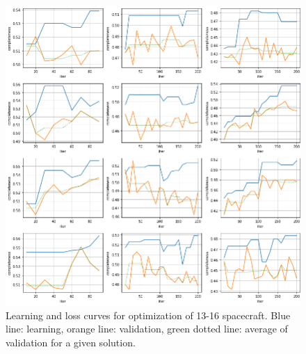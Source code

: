 \begin{figure}[p]
 \centering
 \includegraphics[width=1.0\textwidth]{img/appendix_loss_4.png}
 \caption{Learning and loss curves for optimization of 13-16 spacecraft. Blue line: learning, orange line: validation, green dotted line: average of validation for a given solution.}
\end{figure}



